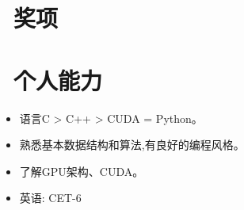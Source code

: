 \documentclass{resume}
\begin{document}
\vspace{-1ex}

\section{\faTrophy\ 奖项}

\vspace{-1ex}

\section{\faCogs\ 个人能力}
\begin{itemize}[parsep=0.5ex]
  \item 语言C > C++ > CUDA = Python。
  \item 熟悉基本数据结构和算法,有良好的编程风格。
  \item 了解GPU架构、CUDA。
  \item 英语: CET-6 
\end{itemize}


%
%
\end{document}
